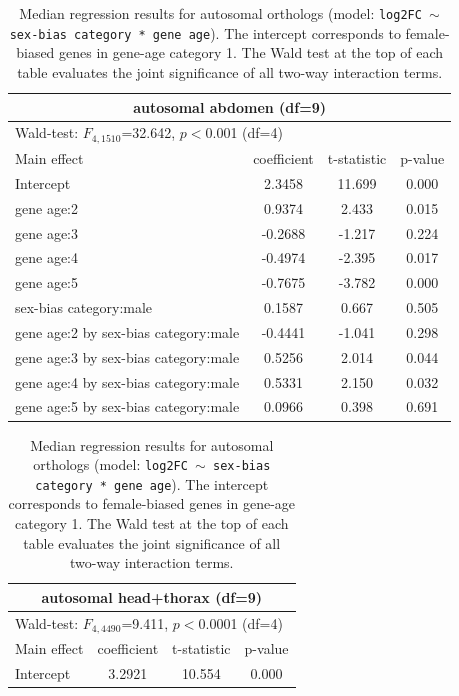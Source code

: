 \documentclass{article}
\begin{document}
\begin{table}[H]
    \centering
    \caption{Median regression results for autosomal orthologs (model: \texttt{log2FC $\sim$ sex-bias category * gene age}). 
    The intercept corresponds to female-biased genes in gene-age category 1. 
    The Wald test at the top of each table evaluates the joint significance of all two-way interaction terms.}
    \label{SItab:A_logFCconservation}
    \begin{tabular}{l |c |c| c}
        \multicolumn{4}{c}{autosomal abdomen (df=9)}\\
        \hline
        \multicolumn{4}{l}{Wald-test: $F_{4,1510}$=32.642, $p<$0.001 (df=4)}\\
        \hline
        Main effect & coefficient & t-statistic & p-value \\
        \hline
        \hline
        Intercept & 2.3458 &  11.699 & 0.000 \\
        \hline
        gene age:2 &  0.9374 &  2.433 & 0.015 \\
        \hline
        gene age:3 & -0.2688 & -1.217 & 0.224 \\
        \hline
        gene age:4 & -0.4974 & -2.395 & 0.017 \\
        \hline
        gene age:5 & -0.7675 & -3.782 & 0.000 \\
        \hline
        sex-bias category:male & 0.1587 &  0.667 & 0.505 \\
        \hline
        gene age:2 by sex-bias category:male &-0.4441 & -1.041 & 0.298 \\
        \hline
        gene age:3 by sex-bias category:male & 0.5256 &  2.014 & 0.044 \\
        \hline
        gene age:4 by sex-bias category:male & 0.5331 &  2.150 & 0.032 \\
        \hline
        gene age:5 by sex-bias category:male & 0.0966 &  0.398 & 0.691 \\
        \hline
    \end{tabular}
    \vspace{1cm}
    \begin{tabular}{l |c |c | c}
        \multicolumn{4}{c}{autosomal head+thorax (df=9)}\\
        \hline
        \multicolumn{4}{l}{Wald-test: $F_{4,4490}$=9.411, $p<$0.0001 (df=4)}\\
        \hline
        Main effect & coefficient & t-statistic & p-value \\
        \hline
        \hline
        Intercept & 3.2921 & 10.554 & 0.000\\

\end{tabular}
\end{table}
\end{document}
